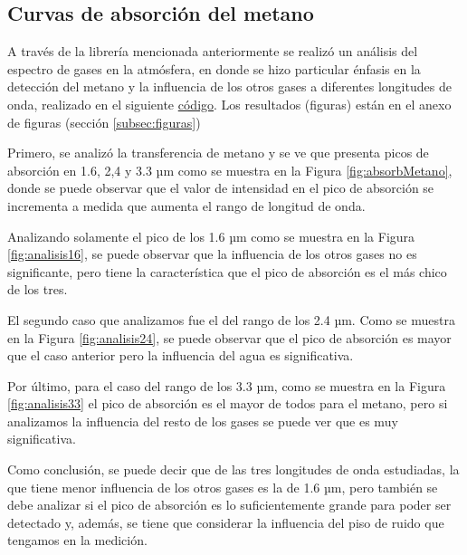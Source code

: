 \subsection{Curvas de absorción del metano}

A través de la librería mencionada anteriormente se realizó un análisis del espectro de gases en la atmósfera, en donde se hizo particular énfasis en la detección del metano y la influencia de los otros gases a diferentes longitudes de onda, realizado en el siguiente \href{https://drive.google.com/open?id=1dH4wrmwYlQlsIZE5aXH2mcc7xXUcFgpj}{código}. Los resultados (figuras) están en el anexo de figuras (sección \ref{subsec:figuras})

Primero, se analizó la transferencia de metano y se ve que presenta picos de absorción en 1.6, 2,4 y 3.3 µm como se muestra en la Figura \ref{fig:absorbMetano}, donde se puede observar que el valor de intensidad en el pico de absorción se incrementa a medida que aumenta el rango de longitud de onda.

Analizando solamente el pico de los 1.6 µm como se muestra en la Figura \ref{fig:analisis16}, se puede observar que la influencia de los otros gases no es significante, pero tiene la característica que el pico de absorción es el más chico de los tres.

El segundo caso que analizamos fue el del rango de los 2.4 µm. Como se muestra en la Figura \ref{fig:analisis24}, se puede observar que el pico de absorción es mayor que el caso anterior pero la influencia del agua es significativa.


Por último, para el caso del rango de los 3.3 µm, como se muestra en la Figura \ref{fig:analisis33} el pico de absorción es el mayor de todos para el metano, pero si analizamos la influencia del resto de los gases se puede ver que es muy significativa.

Como conclusión, se puede decir que de las tres longitudes de onda estudiadas, la que tiene menor influencia de los otros gases es la de 1.6 µm, pero también se debe analizar si el pico de absorción es lo suficientemente grande para poder ser detectado y, además, se tiene que considerar la influencia del piso de ruido que tengamos en la medición.